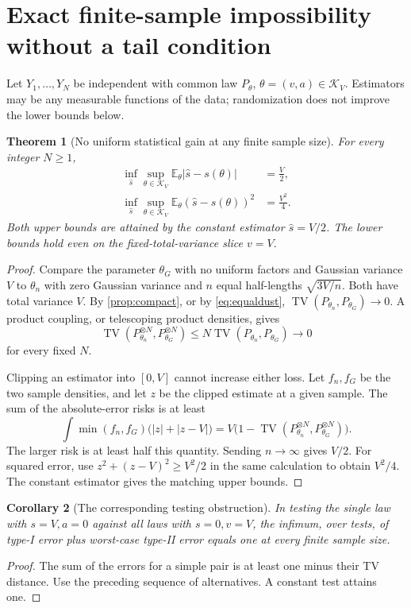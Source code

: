 \documentclass[11pt,letterpaper]{article}
\numberwithin{equation}{section}
\newtheorem{theorem}{Theorem}[section]
\newtheorem{corollary}[theorem]{Corollary}
\theoremstyle{definition}
\theoremstyle{remark}
\newcommand{\E}{\mathbb E}
\newcommand{\TV}{\operatorname{TV}}
\newcommand{\K}{\mathcal K_V}
\begin{document}
\section{Exact finite-sample impossibility without a tail condition}
\label{sec:minimax}

Let $Y_1,\ldots,Y_N$ be independent with common law $P_\theta$,
$\theta=(v,a)\in\K$. Estimators may be any measurable functions of the data;
randomization does not improve the lower bounds below.

\begin{theorem}[No uniform statistical gain at any finite sample size]
\label{thm:minimax}
For every integer $N\ge1$,
\begin{align}
 \inf_{\widehat s}\sup_{\theta\in\K}
       \E_\theta|\widehat s-s(\theta)|&=\frac V2,
 \label{eq:absminimax}\\
 \inf_{\widehat s}\sup_{\theta\in\K}
       \E_\theta(\widehat s-s(\theta))^2&=\frac{V^2}4.
 \label{eq:sqminimax}
\end{align}
Both upper bounds are attained by the constant estimator $\widehat s=V/2$.
The lower bounds hold even on the fixed-total-variance slice $v=V$.
\end{theorem}
\begin{proof}
Compare the parameter $\theta_G$ with no uniform factors and Gaussian variance
$V$ to $\theta_n$ with zero Gaussian variance and $n$ equal half-lengths
$\sqrt{3V/n}$. Both have total variance $V$.
By \cref{prop:compact}, or by \eqref{eq:equaldust},
$\TV(P_{\theta_n},P_{\theta_G})\to0$. A product coupling, or telescoping
product densities, gives
\[
 \TV(P_{\theta_n}^{\otimes N},P_{\theta_G}^{\otimes N})
 \le N\TV(P_{\theta_n},P_{\theta_G})\longrightarrow0
\]
for every fixed $N$.

Clipping an estimator into $[0,V]$ cannot increase either loss. Let $f_n,f_G$
be the two sample densities, and let $z$ be the clipped estimate at a given
sample. The sum of the absolute-error risks is at least
\[
 \int\min(f_n,f_G)\bigl(|z|+|z-V|\bigr)
 =V\bigl(1-\TV(P_{\theta_n}^{\otimes N},P_{\theta_G}^{\otimes N})\bigr).
\]
The larger risk is at least half this quantity. Sending $n\to\infty$ gives
$V/2$. For squared error, use
$z^2+(z-V)^2\ge V^2/2$ in the same calculation to obtain $V^2/4$.
The constant estimator gives the matching upper bounds.
\end{proof}

\begin{corollary}[The corresponding testing obstruction]
\label{cor:test}
In testing the single law with $s=V,a=0$ against all laws with $s=0,v=V$,
the infimum, over tests, of type-I error plus worst-case type-II error equals
one at every finite sample size.
\end{corollary}
\begin{proof}
The sum of the errors for a simple pair is at least one minus their TV
distance. Use the preceding sequence of alternatives. A constant test attains
one.
\end{proof}
\end{document}

